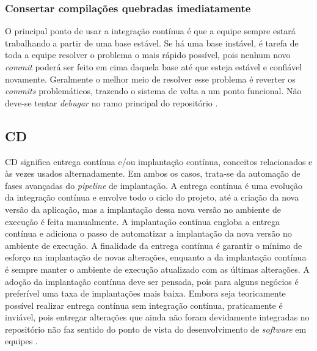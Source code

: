 \subsubsection{Consertar compilações quebradas imediatamente}
O principal ponto de usar a integração contínua é que a equipe sempre estará trabalhando a partir de uma base estável. Se há uma base instável, é tarefa de toda a equipe resolver o problema o mais rápido possível, pois nenhum novo \emph{commit} poderá ser feito em cima daquela base até que esteja estável e confiável novamente. Geralmente o melhor meio de resolver esse problema é reverter os \emph{commits} problemáticos, trazendo o sistema de volta a um ponto funcional. Não deve-se tentar \emph{debugar} no ramo principal do repositório \cite{martin-fowler-continuous-integration}.



\subsection{CD}
CD significa entrega contínua e/ou implantação contínua, conceitos relacionados e às vezes usados alternadamente. Em ambos os casos, trata-se da automação de fases avançadas do \emph{pipeline} de implantação. A entrega contínua é uma evolução da integração contínua e envolve todo o ciclo do projeto, até a criação da nova versão da aplicação, mas a implantação dessa nova versão no ambiente de execução é feita manualmente. A implantação contínua engloba a entrega contínua e adiciona o passo de automatizar a implantação da nova versão no ambiente de execução. A finalidade da entrega contínua é garantir o mínimo de esforço na implantação de novas alterações, enquanto a da implantação contínua é sempre manter o ambiente de execução atualizado com as últimas alterações. A adoção da implantação contínua deve ser pensada, pois para alguns negócios é preferível uma taxa de implantações mais baixa. Embora seja teoricamente possível realizar entrega contínua sem integração contínua, praticamente é inviável, pois entregar alterações que ainda não foram devidamente integradas no repositório não faz sentido do ponto de vista do desenvolvimento de \emph{software} em equipes \cite{gitlab-ci-cd,redhat-ci-cd}.

